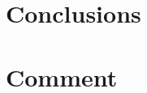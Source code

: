 \documentclass[12pt,twocolumn]{article}
\begin{document}
\section{Conclusions}
    \label{sec:conclusions}
    

\section{Comment}
    \label{sec:comment}
    

    
\clearpage



%

\end{document}

